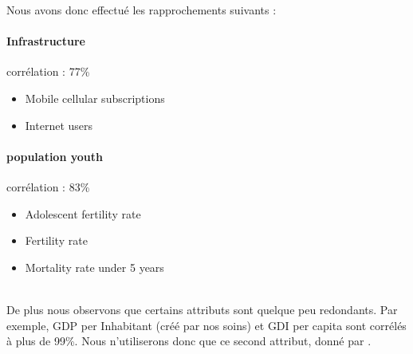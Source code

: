 Nous avons donc effectué les rapprochements suivants : 
\paragraph{Infrastructure} corrélation : 77\%
		\begin{itemize}
			\item Mobile cellular subscriptions
			\item Internet users
		\end{itemize}
\paragraph{population youth} corrélation : 83\%
		\begin{itemize}
			\item Adolescent fertility rate
			\item Fertility rate
			\item Mortality rate under 5 years
		\end{itemize}
\hfill\\

De plus nous observons que certains attributs sont quelque peu redondants. Par exemple, GDP per Inhabitant (créé par nos soins) et GDI per capita sont corrélés à plus de 99\%. Nous n'utiliserons donc que ce second attribut, donné par \lesite .



